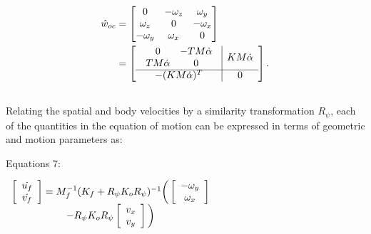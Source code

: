 \documentclass[journal]{IEEEtran}
\begin{document}
\begin{align*}
\hat{w}_{oc} &= \begin{bmatrix}
						0 & -\omega_z & \omega_y \\
						\omega_z & 0 & -\omega_x \\
						-\omega_y & \omega_x & 0
					\end{bmatrix} \\
	     &= 	\left[\begin{array}{c|c}
											\begin{array}{cc}
												0 & -TM\dot{\alpha} \\
												TM\dot{\alpha} & 0 
											\end{array}				& KM\dot{\alpha} \\ \cline{1-2}	
											-(KM\dot{\alpha})^T & 0
										\end{array}\right]. \\ \\
\end{align*}
Relating the spatial and body velocities by a similarity transformation $ R_\psi $, each of the quantities in the equation of motion can be expressed in terms of geometric and motion parameters as:
\begin{center}
Equations 7:
\end{center}


\vspace{0.4cm}
$\begin{array}{c c}
\left[
\begin{array}{c}
\dot{u_f}\\
\dot{v_f}\\
\end{array}
\right] =
 M_f^{-1}(K_f + R_{\psi} K_o R_{\psi})^{-1}\bigg(
\left[
\begin{array}{c}
-\omega_y\\
\omega_x\\
\end{array}
\right] \\
- R_{\psi} K_o R_{\psi}
\left[
\begin{array}{c}
v_x\\
v_y\\
\end{array}
\right]\bigg)&\\
\end{array}
$
\vspace{0.4cm}
\end{document}
